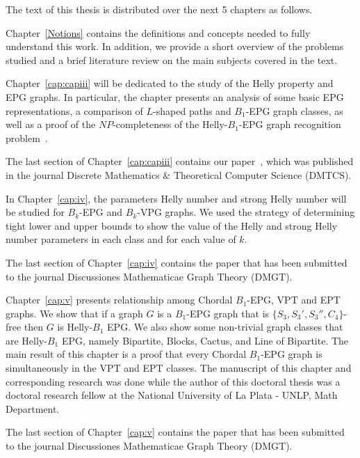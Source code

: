 The text of this thesis is distributed over the next 5 chapters as follows.


Chapter~\ref{Notions} contains the definitions and concepts needed to fully understand this work.  In addition, we provide a short overview of the problems studied and a brief literature review on the main subjects covered in the text.

Chapter~\ref{cap:capiii} will be dedicated to the study of the Helly property and EPG graphs. In particular, the chapter presents an analysis of some basic EPG representations, a comparison of $L$-shaped paths and $B_1$-EPG graph classes, as well as a proof of the $NP$-completeness of the Helly-$B_1$-EPG  graph recognition problem~\cite{dmtcs:6506}. 

The last section of Chapter~\ref{cap:capiii} contains  our paper~\cite{dmtcs:6506}, which was published in the journal Discrete Mathematics \& Theoretical Computer Science (DMTCS).%


In Chapter~\ref{cap:iv}, the parameters Helly number and strong Helly number will be studied for  $ B_k$-EPG and $ B_k$-VPG graphs. We used the strategy of determining tight lower and upper bounds to show the value of the Helly and strong Helly number parameters in each class and for each value of $k$. 

The last section of Chapter~\ref{cap:iv} contains the paper that has been submitted to the  journal Discussiones Mathematicae Graph Theory (DMGT).%

Chapter~\ref{cap:v} presents relationship among Chordal $B_1$-EPG, VPT and EPT graphs. We show that if a graph $G$ is a $B_1$-EPG graph that is  $\{S_3, S_3', S_3'', C_4\}$-free then $G$ is Helly-$B_1$ EPG. We also show some non-trivial graph classes that are  Helly-$B_1$ EPG, namely Bipartite, Blocks, Cactus, and Line of Bipartite. The main result of this chapter is a proof that every Chordal $B_1$-EPG graph is simultaneously in the VPT and EPT classes.  The manuscript of this chapter and corresponding research was done while the author of this doctoral thesis was a doctoral research fellow at the National University of La Plata - UNLP, Math Department. 
 
The last section of Chapter~\ref{cap:v} contains the paper that has been submitted to the  journal Discussiones Mathematicae Graph Theory (DMGT).%


